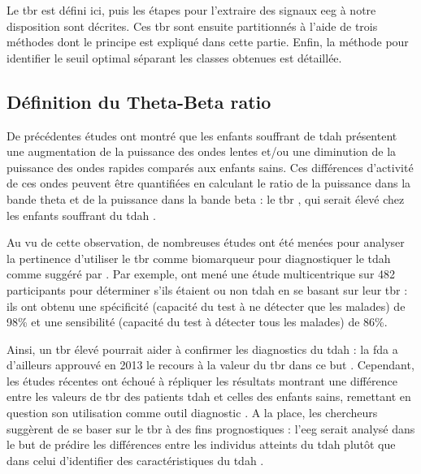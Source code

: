 Le \gls{tbr} est défini ici, puis les étapes pour l'extraire des
signaux \gls{eeg} à notre disposition sont décrites. Ces \gls{tbr} sont ensuite partitionnés à l'aide de trois méthodes dont le principe est expliqué dans cette partie. 
Enfin, la méthode pour identifier le seuil optimal séparant les classes obtenues est détaillée.

\subsection{Définition du Theta-Beta ratio}
De précédentes études ont montré que les enfants souffrant de \gls{tdah} présentent une augmentation
de la puissance des ondes lentes et/ou une diminution de la puissance des ondes rapides
comparés aux enfants sains. Ces différences d'activité de ces 
ondes peuvent être quantifiées en calculant le ratio de la puissance dans la bande theta et de la puissance dans la bande beta : le 
\gls{tbr} \citep{Arns2013}, qui serait élevé chez les enfants souffrant du \gls{tdah} \citep{Lubar1991, Monastra1999, Barry2009, Snyder2006}. 

Au vu de cette observation, de nombreuses études ont été menées pour analyser la pertinence d'utiliser le \gls{tbr} comme biomarqueur pour 
diagnostiquer le \gls{tdah} comme suggéré par \citet{Lubar1991}. 
Par exemple, \citet{Monastra1999} ont mené une étude multicentrique sur 482 participants pour déterminer s'ils étaient ou non \gls{tdah} en se basant sur leur \gls{tbr} : 
ils ont obtenu une spécificité (capacité du test à ne détecter que les malades) de 98\% et une sensibilité (capacité du test à détecter tous les malades) de 86\%. 

Ainsi, un \gls{tbr} élevé pourrait aider à confirmer les diagnostics du \gls{tdah} : la \gls{fda} a d'ailleurs approuvé en 2013 le recours à la valeur du 
\gls{tbr} dans ce but \citep{NebaHealth, FDA, Saad2018, Barry2009}. Cependant, les études récentes ont échoué à répliquer les résultats
montrant une différence entre les valeurs de \gls{tbr} des patients \gls{tdah} et celles des enfants sains, remettant en question son utilisation comme outil 
diagnostic \citep{Zhang2017, Arns2013, Clarke2001, VanDoren2017, Lenartowicz2014}. A la place, les chercheurs suggèrent de se baser sur le \gls{tbr} à des fins prognostiques : l'\gls{eeg} 
serait analysé dans le but de prédire les différences entre les individus atteints du \gls{tdah} plutôt que dans celui d'identifier 
des caractéristiques du \gls{tdah} \citep{Arns2013, Zhang2017}. 

